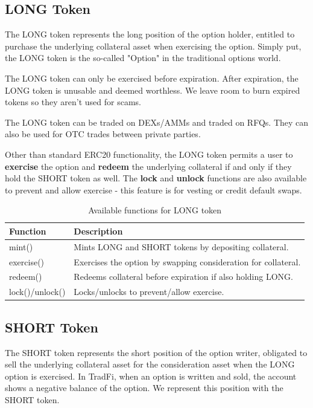 \subsection{LONG Token}

The LONG token represents the long position of the option holder,
entitled to purchase the underlying collateral asset when exercising the option. 
Simply put, the LONG token is the so-called "Option" in the traditional options world.

The LONG token can only be exercised before expiration. After expiration, the LONG token 
is unusable and deemed worthless. We leave room to burn expired tokens so they aren't used for scams. 

The LONG token can be traded on DEXs/AMMs and traded on RFQs. 
They can also be used for OTC trades between private parties.

Other than standard ERC20 functionality, the LONG token permits a user to \textbf{exercise} the option and 
\textbf{redeem} the underlying collateral if and only if they hold the SHORT token as well. 
The \textbf{lock} and \textbf{unlock} functions are also available to prevent and allow exercise - this feature is for vesting or credit default swaps.

\begin{table}[h]
\centering
\begin{tabular}{|p{3cm}|p{4cm}|}
\hline
\textbf{Function} & \textbf{Description} \\
\hline
mint()  & Mints LONG and SHORT tokens by depositing collateral. \\
\hline
exercise() & Exercises the option by swapping consideration for collateral. \\
\hline
redeem() & Redeems collateral before expiration if also holding LONG. \\
\hline
lock()/unlock() & Locks/unlocks to prevent/allow exercise. \\
\hline
\end{tabular}
\caption{Available functions for LONG token}
\label{tab:functions}
\end{table}


\subsection{SHORT Token}

The SHORT token represents the short position of the option writer,
obligated to sell the underlying collateral asset for the consideration
asset when the LONG option is exercised. 
In TradFi, when an option is written and sold, the account shows a negative balance of the option. 
We represent this position with the SHORT token. 

